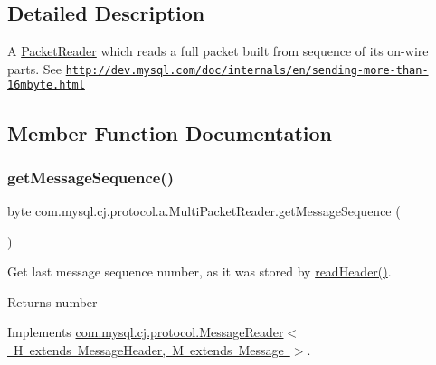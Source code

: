 \subsection{Detailed Description}
A \mbox{\hyperlink{}{Packet\+Reader}} which reads a full packet built from sequence of it\textquotesingle{}s on-\/wire parts. See \href{http://dev.mysql.com/doc/internals/en/sending-more-than-16mbyte.html}{\tt http\+://dev.\+mysql.\+com/doc/internals/en/sending-\/more-\/than-\/16mbyte.\+html} 

\subsection{Member Function Documentation}
\mbox{\label{classcom_1_1mysql_1_1cj_1_1protocol_1_1a_1_1_multi_packet_reader_a237c52b4c174c917ec8a15a5eb2839d1}} 
\subsubsection{\texorpdfstring{get\+Message\+Sequence()}{getMessageSequence()}}
{\footnotesize\ttfamily byte com.\+mysql.\+cj.\+protocol.\+a.\+Multi\+Packet\+Reader.\+get\+Message\+Sequence (\begin{DoxyParamCaption}{ }\end{DoxyParamCaption})}

Get last message sequence number, as it was stored by \mbox{\hyperlink{classcom_1_1mysql_1_1cj_1_1protocol_1_1a_1_1_multi_packet_reader_a6a0250ba430aacfb45f8e1c0a7907465}{read\+Header()}}.

\begin{DoxyReturn}{Returns}
number 
\end{DoxyReturn}


Implements \mbox{\hyperlink{interfacecom_1_1mysql_1_1cj_1_1protocol_1_1_message_reader_ac4a36fb287c5308dd3d7e6157ef4e237}{com.\+mysql.\+cj.\+protocol.\+Message\+Reader$<$ H extends Message\+Header, M extends Message $>$}}.

\mbox{\label{classcom_1_1mysql_1_1cj_1_1protocol_1_1a_1_1_multi_packet_reader_a6a0250ba430aacfb45f8e1c0a7907465}} 
